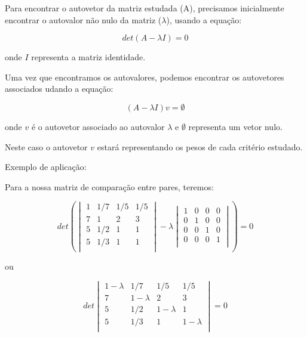 \documentclass{book}
\begin{document}
Para encontrar o autovetor da matriz estudada (A), precisamos inicialmente encontrar o autovalor não nulo da matriz ($\lambda$), usando a equação:

\begin{equation}
det{(A - \lambda  I)} = 0
\end{equation}

onde $I$ representa a matriz identidade.

Uma vez que encontramos os autovalores, podemos encontrar os autovetores associados udando a equação:

\begin{equation}
(A - \lambda I)v = \emptyset 
\end{equation}

onde $v$ é o autovetor associado ao autovalor $\lambda$ e $\emptyset$ representa um vetor nulo.

Neste caso o autovetor $v$ estará representando os pesos de cada critério estudado.

Exemplo de aplicação:

Para a nossa matriz de comparação entre pares, teremos:

\begin{equation}
det{ \left(
\begin{vmatrix}
1 & 1/7 &  1/5 & 1/5 \\
7 & 1 & 2 & 3 \\
5 & 1/2 & 1 & 1 \\
5 & 1/3 & 1 & 1 \\
\end{vmatrix} - 
\lambda \begin{vmatrix}
1 & 0 & 0 & 0 \\
0 & 1 & 0 & 0 \\
0 & 0 & 1 & 0 \\
0 & 0 & 0 & 1 \\
\end{vmatrix} \right) } = 0 \nonumber
\end{equation}

ou

\begin{equation}
det{
\begin{vmatrix}
1 - \lambda & 1/7 &  1/5 & 1/5 \\
7 & 1 - \lambda & 2 & 3 \\
5 & 1/2 & 1 - \lambda & 1 \\
5 & 1/3 & 1 & 1 -\lambda\\
\end{vmatrix}} = 0 \nonumber
\end{equation}
\end{document}
